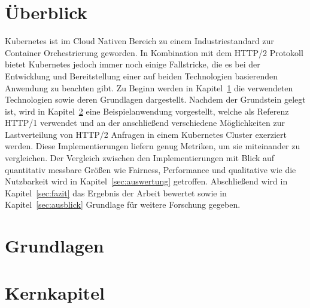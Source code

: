\documentclass[a4paper,12pt]{article}
\begin{document}

    \frontmatter

    \tableofcontents

    \newpage

    \section*{Überblick}
    Kubernetes ist im Cloud Nativen Bereich zu einem Industriestandard zur Container Orchestrierung geworden.
    In Kombination mit dem HTTP/2 Protokoll bietet Kubernetes jedoch immer noch einige Fallstricke, die es bei der Entwicklung und Bereitstellung einer auf beiden Technologien basierenden Anwendung zu beachten gibt.
    Zu Beginn werden in Kapitel~\ref{sec:grundlagen} die verwendeten Technologien sowie deren Grundlagen dargestellt.
    Nachdem der Grundstein gelegt ist, wird in Kapitel~\ref{sec:kernkapitel} eine Beispielanwendung vorgestellt, welche als Referenz HTTP/1 verwendet und an der anschließend verschiedene Möglichkeiten zur Lastverteilung von HTTP/2 Anfragen in einem Kubernetes Cluster exerziert werden.
    Diese Implementierungen liefern genug Metriken, um sie miteinander zu vergleichen.
    Der Vergleich zwischen den Implementierungen mit Blick auf quantitativ messbare Größen wie Fairness, Performance und qualitative wie die Nutzbarkeit wird in Kapitel~\ref{sec:auswertung} getroffen.
    Abschließend wird in Kapitel~\ref{sec:fazit} das Ergebnis der Arbeit bewertet sowie in Kapitel~\ref{sec:ausblick} Grundlage für weitere Forschung gegeben.
    \newpage

    \mainmatter

    \section{Grundlagen}\label{sec:grundlagen}
    

    \section{Kernkapitel}\label{sec:kernkapitel}
    
\end{document}
